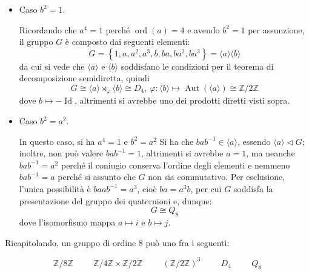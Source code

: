 \documentclass[11pt]{article}
\theoremstyle{style}
\newenvironment{boxenv}[1][]{
    \begin{eqbox}[#1]
    }{
   \end{eqbox}
}
\numberwithin{equation}{subsection}
\begin{document}
\begin{itemize}
	\item Caso $b^2 = 1$.

		Ricordando che $a^4 = 1$ perch\'e $\operatorname{ord}(a) = 4$ e avendo $b^2 = 1$ per assunzione, il gruppo $G$ \`e composto dai seguenti elementi:
		\[
		G = \left\{ 1 , a , a^2 , a^3, b , ba , ba^2 , ba^3 \right\}  = \langle a \rangle\langle b \rangle
		\] 
		da cui si vede che $\langle a \rangle$ e $\langle b \rangle$  soddisfano le condizioni per il teorema di decomposizione semidiretta, quindi
		\[
			G \cong \langle a \rangle \rtimes_\varphi  \langle b \rangle\cong D_{4} , \ \varphi : \langle b \rangle \longmapsto \operatorname{Aut} (\langle a \rangle)\cong \mathbb{Z}/2\mathbb{Z} 
		\] 
		dove $b\mapsto -\operatorname{Id} $, altrimenti si avrebbe uno dei prodotti diretti visti sopra.
	\item Caso $b^2 = a^2$.

		In questo caso, si ha $a^4 = 1 $ e $b^2 = a^2$
		Si ha che $bab^{-1}\in \langle a \rangle$, essendo $\langle a \rangle\lhd G$; inoltre, non pu\`o valere $bab^{-1}=1$, altrimenti si avrebbe $a=1$, ma neanche $bab^{-1}=a^2$ perch\'e il coniugio conserva l'ordine degli elementi e nemmeno $bab^{-1}=a$ perch\'e si assunto che $G$ non sia commutativo.
		Per esclusione, l'unica possibilit\`a \`e $baab^{-1}= a^3$, cio\`e $ba= a^3 b$, per cui $G$ soddisfa la presentazione del gruppo dei quaternioni e, dunque:
		\[
		G \cong Q_8
		\] 
		dove l'isomorfismo mappa $a \mapsto i$ e $b\mapsto j$.
\end{itemize}
Ricapitolando, un gruppo di ordine $8$ pu\`o uno fra i seguenti:
\begin{boxenv}[]
\[
\mathbb{Z}/8\mathbb{Z} \hspace{1cm} \mathbb{Z}/4\mathbb{Z} \times \mathbb{Z}/2\mathbb{Z} \hspace{1cm} (\mathbb{Z}/2\mathbb{Z})^3 \hspace{1cm} D_4 \hspace{1cm}Q_8
\] 
\end{boxenv}
\end{document}
